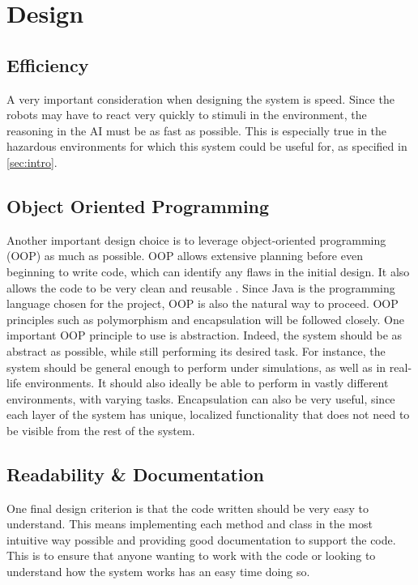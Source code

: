 \documentclass[titlepage,11pt]{article}
\begin{document}
\section{Design}
\label{sec:design}

\subsection{Efficiency}
A very important consideration when designing the system is speed. Since the robots may have to react very quickly to stimuli in the environment, the reasoning in the AI must be as fast as possible. This is especially true in the hazardous environments for which this system could be useful for, as specified in \autoref{sec:intro}.

\subsection{Object Oriented Programming}
Another important design choice is to leverage object-oriented programming (OOP) as much as possible. OOP allows extensive planning before even beginning to write code, which can identify any flaws in the initial design. It also allows the code to be very clean and reusable \cite{oop}. Since Java is the programming language chosen for the project, OOP is also the natural way to proceed.  OOP principles such as polymorphism and encapsulation will be followed closely. One important OOP principle to use is abstraction. Indeed, the system should be as abstract as possible, while still performing its desired task. For instance, the system should be general enough to perform under simulations, as well as in real-life environments. It should also ideally be able to perform in vastly different environments, with varying tasks. Encapsulation can also be very useful, since each layer of the system has unique, localized functionality that does not need to be visible from the rest of the system.

\subsection{Readability \& Documentation}
One final design criterion is that the code written should be very easy to understand. This means implementing each method and class in the most intuitive way possible and providing good documentation to support the code. This is to ensure that anyone wanting to work with the code or looking to understand how the system works has an easy time doing so.
\end{document}
